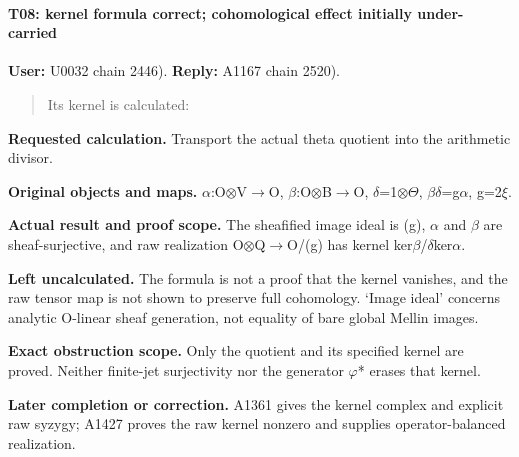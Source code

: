 \paragraph{T08: kernel formula correct; cohomological effect initially
under-carried}\label{t08-kernel-formula-correct-cohomological-effect-initially-under-carried}

\textbf{User:} U0032
\protect{} chain 2446).
\textbf{Reply:} A1167
\protect{} chain 2520).

\begin{quote}
Its kernel is calculated:
\end{quote}

\textbf{Requested calculation.} Transport the actual theta quotient into
the arithmetic divisor.

\textbf{Original objects and maps.}
\allowbreak{}\ensuremath{α}\allowbreak{}:O\allowbreak{}\ensuremath{⊗}\allowbreak{}V\allowbreak{}\ensuremath{→}\allowbreak{}O,
\allowbreak{}\ensuremath{β}\allowbreak{}:O\allowbreak{}\ensuremath{⊗}\allowbreak{}B\allowbreak{}\ensuremath{→}\allowbreak{}O,
\allowbreak{}\ensuremath{δ}\allowbreak{}=1\allowbreak{}\ensuremath{⊗}\allowbreak{}\allowbreak{}\ensuremath{Θ}\allowbreak{},
\allowbreak{}\ensuremath{β}\allowbreak{}\allowbreak{}\ensuremath{δ}\allowbreak{}=g\allowbreak{}\ensuremath{α}\allowbreak{},
g=2\allowbreak{}\ensuremath{ξ}\allowbreak{}.

\textbf{Actual result and proof scope.} The sheafified image ideal is
(g), \allowbreak{}\ensuremath{α}\allowbreak{} and
\allowbreak{}\ensuremath{β}\allowbreak{} are sheaf-surjective, and raw
realization
O\allowbreak{}\ensuremath{⊗}\allowbreak{}Q\allowbreak{}\ensuremath{→}\allowbreak{}O/(g)
has kernel
ker\allowbreak{}\ensuremath{β}\allowbreak{}/\allowbreak{}\ensuremath{δ}\allowbreak{}ker\allowbreak{}\ensuremath{α}\allowbreak{}.

\textbf{Left uncalculated.} The formula is not a proof that the kernel
vanishes, and the raw tensor map is not shown to preserve full
cohomology. `Image ideal' concerns analytic O-linear sheaf generation,
not equality of bare global Mellin images.

\textbf{Exact obstruction scope.} Only the quotient and its specified
kernel are proved. Neither finite-jet surjectivity nor the generator
\allowbreak{}\ensuremath{φ}\allowbreak{}* erases that kernel.

\textbf{Later completion or correction.} A1361 gives the kernel complex
and explicit raw syzygy; A1427 proves the raw kernel nonzero and
supplies operator-balanced realization.

